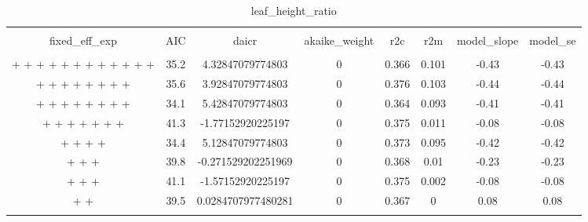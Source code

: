 
\begin{table}[!htbp] \centering 
  \caption{leaf_height_ratio} 
  \label{leaf_height_ratio} 
\begin{tabular}{@{\extracolsep{5pt}} cccccccc} 
\\[-1.8ex]\hline 
\hline \\[-1.8ex] 
fixed\_eff\_exp & AIC & daicr & akaike\_weight & r2c & r2m & model\_slope & model\_se \\ 
\hline \\[-1.8ex] 
 +  +  +  +  +  +  +  +  +  +  +  +  & 35.2 & 4.32847079774803 & 0 & 0.366 & 0.101 & -0.43 & -0.43 \\ 
 +  +  +  +  +  +  +  +  & 35.6 & 3.92847079774803 & 0 & 0.376 & 0.103 & -0.44 & -0.44 \\ 
 +  +  +  +  +  +  +  +  & 34.1 & 5.42847079774803 & 0 & 0.364 & 0.093 & -0.41 & -0.41 \\ 
 +  +  +  +  +  +  +  & 41.3 & -1.77152920225197 & 0 & 0.375 & 0.011 & -0.08 & -0.08 \\ 
 +  +  +  +  & 34.4 & 5.12847079774803 & 0 & 0.373 & 0.095 & -0.42 & -0.42 \\ 
 +  +  +  & 39.8 & -0.271529202251969 & 0 & 0.368 & 0.01 & -0.23 & -0.23 \\ 
 +  +  +  & 41.1 & -1.57152920225197 & 0 & 0.375 & 0.002 & -0.08 & -0.08 \\ 
 +  +  & 39.5 & 0.0284707977480281 & 0 & 0.367 & 0 & 0.08 & 0.08 \\ 
\hline \\[-1.8ex] 
\end{tabular} 
\end{table} 
